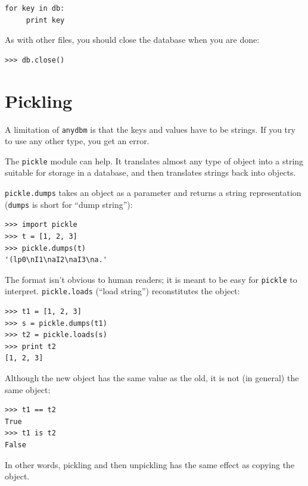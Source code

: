 
\beforeverb
\begin{verbatim}
for key in db:
     print key
\end{verbatim}
\afterverb
%
As with other files, you should close the database when you are
done:

\beforeverb
\begin{verbatim}
>>> db.close()
\end{verbatim}
\afterverb
%



\section{Pickling}


A limitation of {\tt anydbm} is that the keys and values have
to be strings.  If you try to use any other type, you get an
error.


The {\tt pickle} module can help.  It translates
almost any type of object into a string suitable for storage in a
database, and then translates strings back into objects.

{\tt pickle.dumps} takes an object as a parameter and returns
a string representation ({\tt dumps} is short for ``dump string''):

\beforeverb
\begin{verbatim}
>>> import pickle
>>> t = [1, 2, 3]
>>> pickle.dumps(t)
'(lp0\nI1\naI2\naI3\na.'
\end{verbatim}
\afterverb
%
The format isn't obvious to human readers; it is meant to be
easy for {\tt pickle} to interpret.  {\tt pickle.loads}
(``load string'') reconstitutes the object:

\beforeverb
\begin{verbatim}
>>> t1 = [1, 2, 3]
>>> s = pickle.dumps(t1)
>>> t2 = pickle.loads(s)
>>> print t2
[1, 2, 3]
\end{verbatim}
\afterverb
%
Although the new object has the same value as the old, it is
not (in general) the same object:

\beforeverb
\begin{verbatim}
>>> t1 == t2
True
>>> t1 is t2
False
\end{verbatim}
\afterverb
%
In other words, pickling and then unpickling has the same effect
as copying the object.

